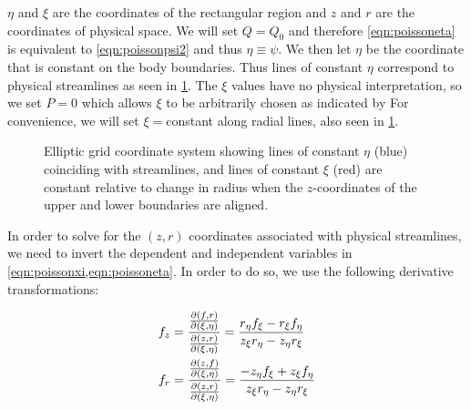 \where \(\eta\) and \(\xi\) are the coordinates of the rectangular region and \(z\) and \(r\) are the coordinates of physical space.
%
We will set \(Q = Q_0\) and therefore \cref{eqn:poissoneta} is equivalent to \cref{eqn:poissonpsi2} and thus \(\eta \equiv \psi\).
%
We then let \(\eta\) be the coordinate that is constant on the body boundaries.
%
Thus lines of constant \(\eta\) correspond to physical streamlines as seen in \cref{fig:gridcoordinates}.
%
The \(\xi\) values have no physical interpretation, so we set \(P=0\) which allows \(\xi\) to be arbitrarily chosen as indicated by \citeauthor{thompson_1974}
%
For convenience, we will set \(\xi=\)constant along radial lines, also seen in \cref{fig:gridcoordinates}.
%
%

\begin{figure}[h!]
    \centering
    
    \caption[Elliptic grid coordinate system.]{Elliptic grid coordinate system showing lines of constant \(\eta\) (blue) coinciding with streamlines, and lines of constant \(\xi\) (red) are constant relative to change in radius when the \(z\)-coordinates of the upper and lower boundaries are aligned.}
    \label{fig:gridcoordinates}
\end{figure}


In order to solve for the \((z,r)\) coordinates associated with physical streamlines, we need to invert the dependent and independent variables in \cref{eqn:poissonxi,eqn:poissoneta}.
%
In order to do so, we use the following derivative transformations:

\begin{subequations}
\begin{align}
    f_z &= \frac{\frac{\partial (f,r)}{\partial (\xi,\eta)}}{\frac{\partial (z,r)}{\partial (\xi,\eta)}} =\frac{r_\eta f_\xi - r_\xi f_\eta}{z_\xi r_\eta - z_\eta r_\xi} \\
    f_r &= \frac{\frac{\partial (z,f)}{\partial (\xi,\eta)}}{\frac{\partial (z,r)}{\partial (\xi,\eta)}} =\frac{- z_\eta f_\xi + z_\xi f_\eta}{z_\xi r_\eta - z_\eta r_\xi}
\end{align}
\end{subequations}


